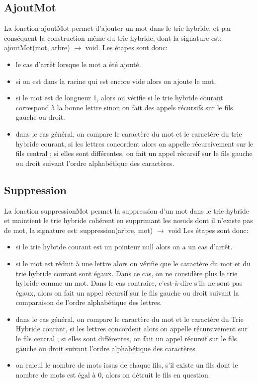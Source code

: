 \documentclass[a4paper,12pt]{report}
\begin{document}
\subsection{AjoutMot}
La fonction ajoutMot permet d'ajouter un mot dans le trie hybride, et par conséquent la construction même du trie hybride,
dont la signature est: ajoutMot(mot, arbre) $\rightarrow$ void.
Les étapes sont donc:
\begin{itemize}
 \item le cas d'arrêt lorsque le mot a été ajouté.
 \item si on est dans la racine qui est encore vide alors on ajoute le mot.
 \item si le mot est de longueur 1, alors on vérifie si le trie hybride courant correspond à la bonne lettre
 sinon on fait des appels récursifs sur le fils gauche ou droit.
 \item dans le cas général, on compare le caractère du mot et le caractère du trie hybride courant, si les lettres
 concordent alors on appelle récursivement sur le fils central ; si elles sont différentes, on fait un appel récursif sur le
 fils gauche ou droit suivant l'ordre alphabétique des caractères.
\end{itemize}

\subsection{Suppression}
La fonction suppressionMot permet la suppression d'un mot dans le trie hybride et maintient le trie hybride cohérent en supprimant
les nœuds dont il n'existe pas de mot, la signature est: suppression(arbre, mot) $\rightarrow$ void
Les étapes sont donc:
\begin{itemize}
 \item si le trie hybride courant est un pointeur null alors on a un cas d'arrêt.
 \item si le mot est réduit à une lettre alors on vérifie que le caractère du mot et du trie hybride courant sont égaux. Dans ce cas, on ne considère plus le trie hybride comme un mot. Dans le cas contraire, c'est-à-dire s'ils ne sont
 pas égaux, alors on fait un appel récursif sur le fils gauche ou droit suivant la comparaison de l'ordre alphabétique des lettres.
 \item dans le cas général, on compare le caractère du mot et le caractère du Trie Hybride courant, si les lettres
 concordent alors on appelle récursivement sur le fils central ; si elles sont différentes, on fait un appel récursif sur le
 fils gauche ou droit suivant l'ordre alphabétique des caractères.
 \item on calcul le nombre de mots issus de chaque fils, s'il existe un fils dont le nombre de mots est égal à 0, alors on détruit
 le fils en question.
\end{itemize}
\end{document}
